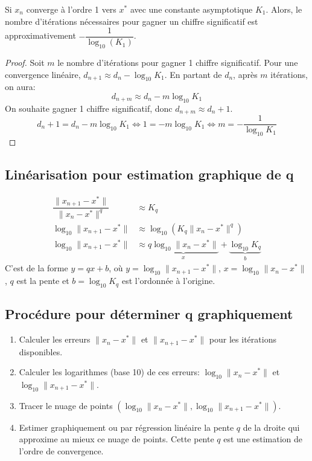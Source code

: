 \documentclass[oneside]{book}
\begin{document}
\begin{proposition}
Si $x_n$ converge à l'ordre 1 vers $x^*$ avec une constante asymptotique $K_1$. Alors, le nombre d'itérations nécessaires pour gagner un chiffre significatif est approximativement $-\dfrac{1}{\log_{10}(K_1)}$.
\end{proposition}

\begin{proof}
Soit $m$ le nombre d'itérations pour gagner 1 chiffre significatif.
Pour une convergence linéaire, $d_{n+1} \approx d_n - \log_{10} K_1$. En partant de $d_n$, après $m$ itérations, on aura:
$$ d_{n+m} \approx d_n -m \log_{10} K_1 $$
On souhaite gagner 1 chiffre significatif, donc $d_{n+m} \approx d_n + 1$.
$$ d_n + 1 = d_n - m \log_{10} K_1 \Leftrightarrow 1 = - m \log_{10} K_1 \Leftrightarrow m = - \dfrac{1}{\log_{10} K_1} $$
\end{proof}


\subsection{Linéarisation pour estimation graphique de q}
\begin{align*}
\dfrac{\|x_{n+1}-x^*\|}{\|x_n-x^*\|^q} &\approx K_q \\
\log_{10} \|x_{n+1}-x^*\| &\approx \log_{10} (K_q \|x_n-x^*\|^q) \\
\log_{10} \|x_{n+1}-x^*\| &\approx \underbrace{q \log_{10} \|x_n-x^*\|}_{x} + \underbrace{\log_{10} K_q}_{b}
\end{align*}
C'est de la forme $y = qx + b$, où $y = \log_{10} \|x_{n+1}-x^*\|$, $x = \log_{10} \|x_n-x^*\|$, $q$ est la pente et $b = \log_{10} K_q$ est l'ordonnée à l'origine.

\subsection{Procédure pour déterminer q graphiquement}
\begin{enumerate}
    \item Calculer les erreurs $\|x_n - x^*\|$ et $\|x_{n+1} - x^*\|$ pour les itérations disponibles.
    \item Calculer les logarithmes (base 10) de ces erreurs: $\log_{10} \|x_n-x^*\|$ et $\log_{10} \|x_{n+1}-x^*\|$.
    \item Tracer le nuage de points $(\log_{10} \|x_n-x^*\|, \log_{10} \|x_{n+1}-x^*\|)$.
    \item Estimer graphiquement ou par régression linéaire la pente $q$ de la droite qui approxime au mieux ce nuage de points. Cette pente $q$ est une estimation de l'ordre de convergence.
\end{enumerate}
\end{document}
